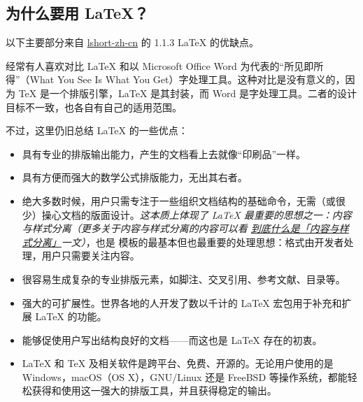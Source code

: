 
\subsection{为什么要用 \LaTeX{}？}

以下主要部分来自 \href{https://ctan.math.illinois.edu/info/lshort/chinese/lshort-zh-cn.pdf}{lshort-zh-cn} 的 1.1.3 \LaTeX{} 的优缺点。

经常有人喜欢对比 \LaTeX{} 和以 Microsoft Office Word 为代表的“所见即所得”（What You See Is What You Get）字处理工具。这种对比是没有意义的，因为 \TeX{} 是一个排版引擎，\LaTeX{} 是其封装，而 Word 是字处理工具。二者的设计目标不一致，也各自有自己的适用范围。

不过，这里仍旧总结 \LaTeX{} 的一些优点：
\begin{itemize}
  \item 具有专业的排版输出能力，产生的文档看上去就像“印刷品”一样。
  \item 具有方便而强大的数学公式排版能力，无出其右者。
  \item 绝大多数时候，用户只需专注于一些组织文档结构的基础命令，无需（或很少）操心文档的版面设计。\emph{这本质上体现了 \LaTeX{} 最重要的思想之一：内容与样式分离（更多关于内容与样式分离的内容可以看 \href{https://liam.page/2019/03/18/separation-of-content-and-presentation/}{到底什么是「内容与样式分离」}一文）}，也是  模板的最基本但也最重要的处理思想：格式由开发者处理，用户只需要关注内容。
  \item 很容易生成复杂的专业排版元素，如脚注、交叉引用、参考文献、目录等。
  \item 强大的可扩展性。世界各地的人开发了数以千计的 \LaTeX{} 宏包用于补充和扩展 \LaTeX{} 的功能。
  \item 能够促使用户写出结构良好的文档——而这也是 \LaTeX{} 存在的初衷。
  \item \LaTeX{} 和 \TeX{} 及相关软件是跨平台、免费、开源的。无论用户使用的是 Windows，macOS（OS X），GNU/Linux 还是 FreeBSD 等操作系统，都能轻松获得和使用这一强大的排版工具，并且获得稳定的输出。
\end{itemize}